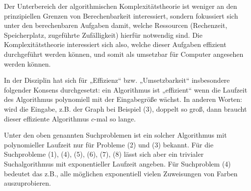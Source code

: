 Der Unterbereich der algorithmischen Komplexitätstheorie ist weniger an den prinzipiellen Grenzen von Berechenbarkeit interessiert, sondern fokussiert sich unter den berechenbaren Aufgaben damit, welche Ressourcen (Rechenzeit, Speicherplatz, zugeführte Zufälligkeit) hierfür notwendig sind. Die Komplexitätstheorie interessiert sich also, welche dieser Aufgaben effizient durchgeführt werden können, und somit als umsetzbar für Computer angesehen werden können. 

In der Disziplin hat sich für „Effizienz“ bzw. „Umsetzbarkeit“ insbesondere folgender Konsens durchgesetzt: ein Algorithmus ist „effizient“ wenn die Laufzeit des Algorithmus polynomiell mit der Eingabegröße wächst. In anderen Worten: wird die Eingabe, z.B. der Graph bei Beispiel (3), doppelt so groß, dann braucht dieser effiziente Algorithmus $c$-mal so lange.

Unter den oben genannten Suchproblemen ist ein solcher Algorithmus mit polynomieller Laufzeit nur für Probleme (2) und (3) bekannt.
Für die Suchprobleme (1), (4), (5), (6), (7), (8) lässt sich aber ein trivialer Suchalgorithmus mit exponentieller Laufzeit angeben. Für Suchproblem (4) bedeutet das z.B., alle möglichen exponentiell vielen Zuweisungen von Farben auszuprobieren.


